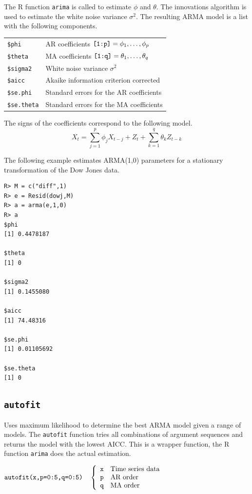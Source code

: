 \documentclass[12pt]{article}
\begin{document}
\bigskip
\noindent
The R function {\tt arima} is called to
estimate $\phi$ and $\theta$.
The innovations algorithm is used to estimate the white noise
variance $\sigma^2$.
The resulting ARMA model is a list with the following components.

\begin{center}
\begin{tabular}{ll}
{\tt \$phi} & AR coefficients $\hbox{\tt[1:p]}=\phi_1,\ldots,\phi_p$\\
{\tt \$theta} & MA coefficients $\hbox{\tt[1:q]}=\theta_1,\ldots,\theta_q$\\
{\tt \$sigma2} & White noise variance $\sigma^2$\\
{\tt \$aicc} & Akaike information criterion corrected\\
{\tt \$se.phi} & Standard errors for the AR coefficients\\
{\tt \$se.theta} & Standard errors for the MA coefficients
\end{tabular}
\end{center}

\noindent
The signs of the coefficients correspond to the following model.
\[
X_t=\sum_{j=1}^p\phi_jX_{t-j}+Z_t+\sum_{k=1}^q\theta_kZ_{t-k}
\]

\noindent
The following example estimates ARMA(1,0) parameters
for a stationary transformation of the Dow Jones data.

\begin{verbatim}
R> M = c("diff",1)
R> e = Resid(dowj,M)
R> a = arma(e,1,0)
R> a
$phi
[1] 0.4478187

$theta
[1] 0

$sigma2
[1] 0.1455080

$aicc
[1] 74.48316

$se.phi
[1] 0.01105692

$se.theta
[1] 0
\end{verbatim}

\newpage

\subsection{\tt autofit}
Uses maximum likelihood to determine the best ARMA model given a range of models.
The {\tt autofit} function tries all combinations of argument sequences and returns the model
with the lowest AICC.
This is a wrapper function,
the R function {\tt arima} does
the actual estimation.

\bigskip
$
\hbox{\tt autofit(x,p=0:5,q=0:5)}\quad\left\{\begin{array}{ll}
{\tt x} & \hbox{Time series data}\\
{\tt p} & \hbox{AR order}\\
{\tt q} & \hbox{MA order}
\end{array}\right.
$
\end{document}
